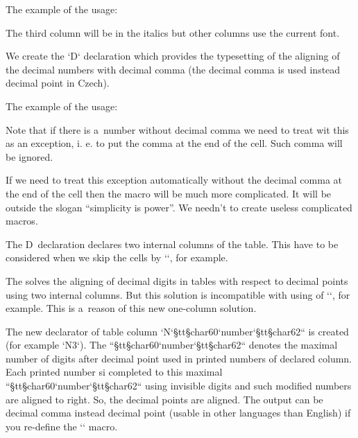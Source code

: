 The example of the usage: 

\begtt
{} 
\endtt


The third column will be in the italics but other columns use the current font. 


 


We create the `D` declaration which provides the typesetting of the aligning of the decimal numbers with decimal comma (the decimal comma is used instead decimal point in Czech). 

\begtt
\def\tabdeclareD{\tabiteml\hfil\scandecnumber##&##\hfil\tabitemr} 
\def\scandecnumber#1,{#1\ifdim\lastskip>0pt \unskip\phantom,\else,\fi&} 
\endtt


The example of the usage: 

\begtt
{} 
\endtt


Note that if there is a~number without decimal comma we need to treat wit this as an exception, i. e. to put the comma at the end of the cell. Such comma will be ignored. 



If we need to treat this exception automatically without the decimal comma at the end of the cell then the macro will be much more complicated. It will be outside the slogan “simplicity is power”. We needn't to create useless complicated macros. 



The D~declaration declares two internal columns of the table. This have to be considered when we skip the cells by `\multispan`, for example. 


 


The  solves the aligning of decimal digits in tables with respect to decimal points using two internal columns. But this solution is incompatible with using of `\tskip`, for example. This is a~reason of this new one-column solution.  



The new declarator of table column `N`{§tt§char60}`number`{§tt§char62}`` is created (for example `N3`). The ``{§tt§char60}`number`{§tt§char62}`` denotes the maximal number of digits after decimal point used in printed numbers of declared column. Each printed number si completed to this maximal ``{§tt§char60}`number`{§tt§char62}`` using invisible digits and such modified numbers are aligned  to right. So, the decimal points are aligned. The output can be decimal comma instead decimal point (usable in other languages than English) if you re-define the `\decimalpoint` macro. 



